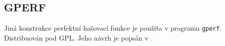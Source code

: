 \subsection{GPERF}

Jiná konstrukce perfektní hašovací funkce je použita v programu
{\tt gperf}. Distribuován pod GPL. 
Jeho návrh je popsán v \cite{douglas-GPERF}.


\def\xx{%
\section{Hašování pro externí paměť}

\mnote{Tohle už Koubek nepřednáší} %
Adresář.

MEMBER, INSERT, DELETE

Očekávané zaplnění stránky, počet stránek, velikost adresáře --- jen
citace, tabulka pro některá čísla.
}%

